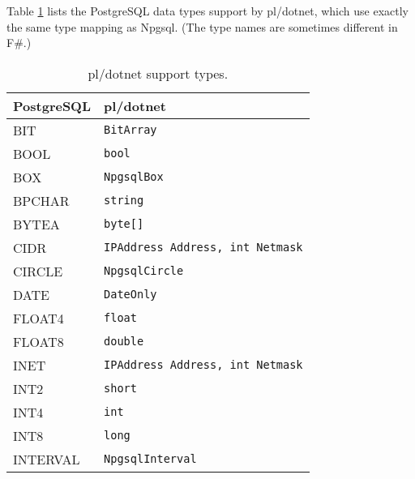\documentclass[sigconf,techreport,authorversion,nonacm]{acmart}
\begin{document}
Table \ref{table:pldotnet_support_types} lists the PostgreSQL data
types support by pl/dotnet, which use exactly the same type mapping
as Npgsql. (The type names are sometimes different in F\#.)

\begin{table}[!htbp]
        \caption{pl/dotnet support types.}
        \label{table:pldotnet_support_types}
        \begin{tabular}{l | l}
                \toprule
                \rowcolor{gray!25} \textbf{PostgreSQL} & \textbf{pl/dotnet}                      \\ \midrule
                BIT                                    & \texttt{BitArray}                       \\
                BOOL                                   & \texttt{bool}                           \\
                BOX                                    & \texttt{NpgsqlBox}                      \\
                BPCHAR                                 & \texttt{string}                         \\
                BYTEA                                  & \texttt{byte[]}                         \\
                CIDR                                   & \texttt{IPAddress Address, int Netmask} \\
                CIRCLE                                 & \texttt{NpgsqlCircle}                   \\
                DATE                                   & \texttt{DateOnly}                       \\
                FLOAT4                                 & \texttt{float}                          \\
                FLOAT8                                 & \texttt{double}                         \\
                INET                                   & \texttt{IPAddress Address, int Netmask} \\
                INT2                                   & \texttt{short}                          \\
                INT4                                   & \texttt{int}                            \\
                INT8                                   & \texttt{long}                           \\
                INTERVAL                               & \texttt{NpgsqlInterval}                 \\

\end{tabular}
\end{table}
\end{document}
